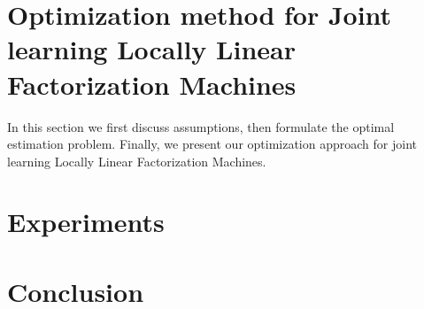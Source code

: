 \documentclass{article}
\begin{document}
\section{Optimization method for Joint learning Locally Linear Factorization Machines}
In this section we first discuss assumptions, then formulate the optimal estimation problem. Finally, we present our optimization approach for joint learning Locally Linear Factorization Machines.


 
\section{Experiments}
\section{Conclusion}


\end{document}
